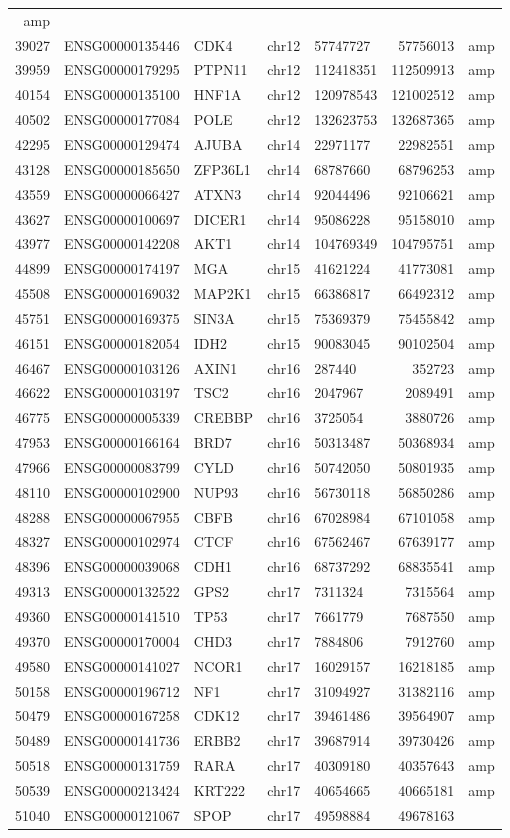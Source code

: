 \documentclass[]{article}
\begin{document}
\begin{longtable}[]{@{}rrlrlrl@{}}
amp\tabularnewline
39027 & ENSG00000135446 & CDK4 & chr12 & 57747727 & 57756013 &
amp\tabularnewline
39959 & ENSG00000179295 & PTPN11 & chr12 & 112418351 & 112509913 &
amp\tabularnewline
40154 & ENSG00000135100 & HNF1A & chr12 & 120978543 & 121002512 &
amp\tabularnewline
40502 & ENSG00000177084 & POLE & chr12 & 132623753 & 132687365 &
amp\tabularnewline
42295 & ENSG00000129474 & AJUBA & chr14 & 22971177 & 22982551 &
amp\tabularnewline
43128 & ENSG00000185650 & ZFP36L1 & chr14 & 68787660 & 68796253 &
amp\tabularnewline
43559 & ENSG00000066427 & ATXN3 & chr14 & 92044496 & 92106621 &
amp\tabularnewline
43627 & ENSG00000100697 & DICER1 & chr14 & 95086228 & 95158010 &
amp\tabularnewline
43977 & ENSG00000142208 & AKT1 & chr14 & 104769349 & 104795751 &
amp\tabularnewline
44899 & ENSG00000174197 & MGA & chr15 & 41621224 & 41773081 &
amp\tabularnewline
45508 & ENSG00000169032 & MAP2K1 & chr15 & 66386817 & 66492312 &
amp\tabularnewline
45751 & ENSG00000169375 & SIN3A & chr15 & 75369379 & 75455842 &
amp\tabularnewline
46151 & ENSG00000182054 & IDH2 & chr15 & 90083045 & 90102504 &
amp\tabularnewline
46467 & ENSG00000103126 & AXIN1 & chr16 & 287440 & 352723 &
amp\tabularnewline
46622 & ENSG00000103197 & TSC2 & chr16 & 2047967 & 2089491 &
amp\tabularnewline
46775 & ENSG00000005339 & CREBBP & chr16 & 3725054 & 3880726 &
amp\tabularnewline
47953 & ENSG00000166164 & BRD7 & chr16 & 50313487 & 50368934 &
amp\tabularnewline
47966 & ENSG00000083799 & CYLD & chr16 & 50742050 & 50801935 &
amp\tabularnewline
48110 & ENSG00000102900 & NUP93 & chr16 & 56730118 & 56850286 &
amp\tabularnewline
48288 & ENSG00000067955 & CBFB & chr16 & 67028984 & 67101058 &
amp\tabularnewline
48327 & ENSG00000102974 & CTCF & chr16 & 67562467 & 67639177 &
amp\tabularnewline
48396 & ENSG00000039068 & CDH1 & chr16 & 68737292 & 68835541 &
amp\tabularnewline
49313 & ENSG00000132522 & GPS2 & chr17 & 7311324 & 7315564 &
amp\tabularnewline
49360 & ENSG00000141510 & TP53 & chr17 & 7661779 & 7687550 &
amp\tabularnewline
49370 & ENSG00000170004 & CHD3 & chr17 & 7884806 & 7912760 &
amp\tabularnewline
49580 & ENSG00000141027 & NCOR1 & chr17 & 16029157 & 16218185 &
amp\tabularnewline
50158 & ENSG00000196712 & NF1 & chr17 & 31094927 & 31382116 &
amp\tabularnewline
50479 & ENSG00000167258 & CDK12 & chr17 & 39461486 & 39564907 &
amp\tabularnewline
50489 & ENSG00000141736 & ERBB2 & chr17 & 39687914 & 39730426 &
amp\tabularnewline
50518 & ENSG00000131759 & RARA & chr17 & 40309180 & 40357643 &
amp\tabularnewline
50539 & ENSG00000213424 & KRT222 & chr17 & 40654665 & 40665181 &
amp\tabularnewline
51040 & ENSG00000121067 & SPOP & chr17 & 49598884 & 49678163 &

\end{longtable}
\end{document}
